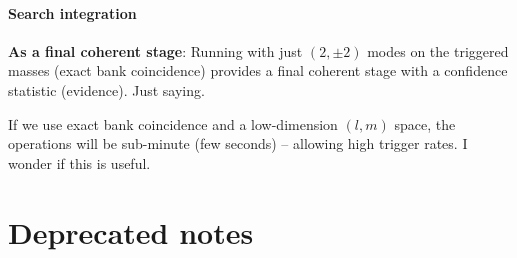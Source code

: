 \documentclass[twocolumn,prd,nofootinbib]{revtex4}
\newcommand\ForRichardOnly[1]{}
\newcommand\editremark[1]{{\color{red} #1}}
\newcommand\qmstateproduct[2]{\left\langle#1|#2\right\rangle}
\begin{document}
\begin{widetext}
\subsection{Search integration}

\noindent \textbf{As a final coherent stage}: Running with just $(2,\pm 2)$ modes on the triggered masses (exact bank
coincidence) provides a final coherent stage with a confidence statistic (evidence).  Just saying.

If we use exact bank coincidence and a low-dimension $(l,m)$ space, the operations will be sub-minute (few seconds) --
allowing high trigger rates. \editremark{I wonder if this is useful}.

\part{Deprecated notes}

\ForRichardOnly{
\section{Some stuff we are not using}

\subsection{Extrinsic marginalization: Localized sources in $t,\hat{k}$ via time-of-flight }
\label{sec:sub:MarginalizeViaTimeOfFlight}

\noindent \textbf{Arrival-time sampling}: Physical sources will have well-determined arrival times at each detector,
for any significant template.  In our notation, for each detector $k$, each intrinsc parameters $\lambda$, and each
$(l,m)$ there is some pair of real numbers $\rho_{k,lm},t_{k,lm}$  that describes the local maximum's event time and
signal magnitude:
\begin{eqnarray}
\rho_{k,lm} \equiv |Q_{k,lm}(t_{k,lm})|/\sqrt{U_{k,lm,lm}}
\end{eqnarray}
where $Q$ has a local maximum at $t_{k,lm}$.  
[To order of magnitude $\rho_{k,lm}$ is similar to the signal amplitude $\qmstateproduct{\hat{H}_k}{\hat{H}_k}_k$ of the
data in that detector, if a signal is present.]
%
Based on this information, a simple a priori \emph{estimate} for the arrival times $t_1\ldots t_3$ in each detector are possible
[fixing some $(l,m)$ pair -- say (2,2)]: we can build a distribution.

}
\end{widetext}
\end{document}
